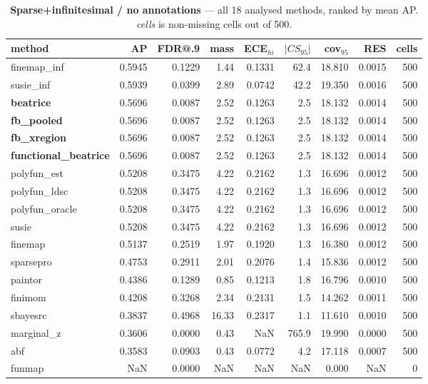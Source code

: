 \begin{table}[htbp]\centering\small
\caption{\textbf{Sparse+infinitesimal / no annotations} --- all 18 analysed methods, ranked by mean AP. \emph{cells} is non-missing cells out of 500.}
\label{tab:main-sparse_inf-none}
\begin{tabular}{lrrrrrrr r}\toprule
method & AP & FDR@.9 & mass & ECE$_{hi}$ & $|CS_{95}|$ & cov$_{95}$ & RES & cells\\\midrule
finemap\_inf & 0.5945 & 0.1229 & 1.44 & 0.1331 & 62.4 & 18.810 & 0.0015 & 500\\
susie\_inf & 0.5939 & 0.0399 & 2.89 & 0.0742 & 42.2 & 19.350 & 0.0016 & 500\\
\textbf{beatrice} & 0.5696 & 0.0087 & 2.52 & 0.1263 & 2.5 & 18.132 & 0.0014 & 500\\
\textbf{fb\_pooled} & 0.5696 & 0.0087 & 2.52 & 0.1263 & 2.5 & 18.132 & 0.0014 & 500\\
\textbf{fb\_xregion} & 0.5696 & 0.0087 & 2.52 & 0.1263 & 2.5 & 18.132 & 0.0014 & 500\\
\textbf{functional\_beatrice} & 0.5696 & 0.0087 & 2.52 & 0.1263 & 2.5 & 18.132 & 0.0014 & 500\\
polyfun\_est & 0.5208 & 0.3475 & 4.22 & 0.2162 & 1.3 & 16.696 & 0.0012 & 500\\
polyfun\_ldsc & 0.5208 & 0.3475 & 4.22 & 0.2162 & 1.3 & 16.696 & 0.0012 & 500\\
polyfun\_oracle & 0.5208 & 0.3475 & 4.22 & 0.2162 & 1.3 & 16.696 & 0.0012 & 500\\
susie & 0.5208 & 0.3475 & 4.22 & 0.2162 & 1.3 & 16.696 & 0.0012 & 500\\
finemap & 0.5137 & 0.2519 & 1.97 & 0.1920 & 1.3 & 16.380 & 0.0012 & 500\\
sparsepro & 0.4753 & 0.2911 & 2.01 & 0.2076 & 1.4 & 15.836 & 0.0012 & 500\\
paintor & 0.4386 & 0.1289 & 0.85 & 0.1213 & 1.8 & 16.796 & 0.0010 & 500\\
finimom & 0.4208 & 0.3268 & 2.34 & 0.2131 & 1.5 & 14.262 & 0.0011 & 500\\
sbayesrc & 0.3837 & 0.4968 & 16.33 & 0.2317 & 1.1 & 11.610 & 0.0010 & 500\\
marginal\_z & 0.3606 & 0.0000 & 0.43 & NaN & 765.9 & 19.990 & 0.0000 & 500\\
abf & 0.3583 & 0.0903 & 0.43 & 0.0772 & 4.2 & 17.118 & 0.0007 & 500\\
funmap & NaN & 0.0000 & NaN & NaN & NaN & 0.000 & NaN & 0\\
\bottomrule\end{tabular}\end{table}
